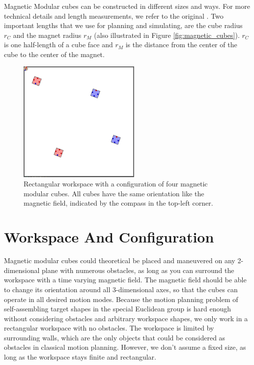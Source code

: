 Magnetic Modular cubes can be constructed in different sizes and ways. For more technical details and length measurements, we refer to the original \cite{Bhattacharjee2022}.
Two important lengths that we use for planning and simulating, are the cube radius $r_C$ and the magnet radius $r_M$ (also illustrated in Figure \ref{fig:magnetic_cubes}).
$r_C$ is one half-length of a cube face and $r_M$ is the distance from the center of the cube to the center of the magnet.

\begin{figure}
	\centering
	\includegraphics[width=0.53\textwidth]{figures/workspace_config.png}
	\caption{Rectangular workspace with a configuration of four magnetic modular cubes. All cubes have the same orientation like the magnetic field, indicated by the compass in the top-left corner.}
	\label{fig:workspace_config}
\end{figure}

\section{Workspace And Configuration}
Magnetic modular cubes could theoretical be placed and maneuvered on any 2-dimensional plane with numerous obstacles, as long as you can surround the workspace with a time varying magnetic field.
The magnetic field should be able to change its orientation around all 3-dimensional axes, so that the cubes can operate in all desired motion modes.
Because the motion planning problem of self-assembling target shapes in the special Euclidean group is hard enough without considering obstacles and arbitrary workspace shapes, we only work in a rectangular workspace with no obstacles.
The workspace is limited by surrounding walls, which are the only objects that could be considered as obstacles in classical motion planning.
However, we don't assume a fixed size, as long as the workspace stays finite and rectangular.

